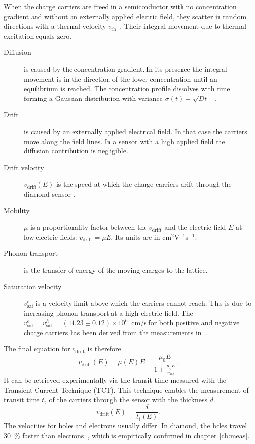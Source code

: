 When the charge carriers are freed in a semiconductor with no concentration gradient and without an externally applied electric field, they scatter in random directions with a thermal velocity $v_{\mathrm{th}}$~\cite{}. Their integral movement due to thermal excitation equals zero. 

\begin{description}

\item[Diffusion] is caused by the concentration gradient. In its presence the integral movement is in the direction of the lower concentration until an equilibrium is reached.
The concentration profile dissolves with time forming a Gaussian distribution with variance $\sigma(t)=\sqrt{Dt}$~\cite{} .

\item[Drift] is caused by an externally applied electrical field. In that case the carriers move along the field lines. In a sensor with a high applied field the diffusion contribution is negligible. 

\item[Drift velocity] $v_\mathrm{drift}(E)$ is the speed at which the charge carriers drift through the diamond sensor~\cite{}.

\item[Mobility] $\mu$ is a proportionality factor between the $v_\mathrm{drift}$ and the electric field $E$ at low electric fields: $v_\mathrm{drift} = \mu E$. Its units are in cm$^2$V$^{-1}$s$^{-1}$.

\item[Phonon transport] is the transfer of energy of the moving charges to the lattice.

\item[Saturation velocity] $v^e_\mathrm{sat}$ is a velocity limit above which the carriers cannot reach. This is due to increasing phonon transport at a high electric field. The $v^e_\mathrm{sat}=v^h_\mathrm{sat}=(14.23\pm0.12)\times10^6$~cm/s for both positive and negative charge carriers has been derived from the measurements in~\cite{JANSEN:00001}.

\end{description}

 The final equation for $v_\mathrm{drift}$ is therefore
\begin{equation}
\label{eq:vsat}
v_\mathrm{drift}(E) = \mu(E)E= \frac{\mu_\mathrm{0} E}{1 + \frac{\mu_\mathrm{o} E}{v_\mathrm{sat}}}.
\end{equation}
It can be retrieved experimentally via the transit time measured with the Transient Current Technique (TCT). This technique enables the measurement of transit time $t_\mathrm{t}$ of the carriers through the sensor with the thickness $d$. 
\begin{equation}
\label{eq:vsat}
v_\mathrm{drift}(E) = \frac{d}{t_\mathrm{t}(E)}.
\end{equation}
The velocities for holes and electrons usually differ. In diamond, the holes travel 30~\% faster than electrons~\cite{}, which is empirically confirmed in chapter~\ref{ch:meas}.


